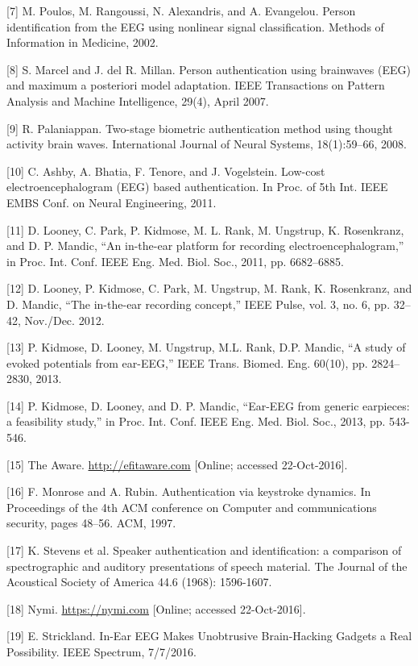 \documentclass[11pt]{article}
\begin{document}
[7]
M. Poulos, M. Rangoussi, N. Alexandris, and A. Evangelou. Person identification from the
EEG using nonlinear signal classification. Methods of Information in Medicine, 2002.

[8]
S. Marcel and J. del R. Millan. Person authentication using brainwaves (EEG) and
maximum a posteriori model adaptation. IEEE Transactions on Pattern Analysis and
Machine Intelligence, 29(4), April 2007.

[9]
R. Palaniappan. Two-stage biometric authentication method using thought activity brain
waves. International Journal of Neural Systems, 18(1):59–66, 2008.

[10]
C. Ashby, A. Bhatia, F. Tenore, and J. Vogelstein. Low-cost electroencephalogram (EEG)
based authentication. In Proc. of 5th Int. IEEE EMBS Conf. on Neural Engineering, 2011.

[11]
D. Looney, C. Park, P. Kidmose, M. L. Rank, M. Ungstrup, K. Rosenkranz, and D. P.
Mandic, “An in-the-ear platform for recording electroencephalogram,” in Proc. Int. Conf.
IEEE Eng. Med. Biol. Soc., 2011, pp. 6682–6885.

[12]
D. Looney, P. Kidmose, C. Park, M. Ungstrup, M. Rank, K. Rosenkranz, and D. Mandic,
“The in-the-ear recording concept,” IEEE Pulse, vol. 3, no. 6, pp. 32–42, Nov./Dec. 2012.

[13]
P. Kidmose, D. Looney, M. Ungstrup, M.L. Rank, D.P. Mandic, “A study of evoked
potentials from ear-EEG,” IEEE Trans. Biomed. Eng. 60(10), pp. 2824–2830, 2013.

[14]
P. Kidmose, D. Looney, and D. P. Mandic, “Ear-EEG from generic earpieces: a feasibility
study,” in Proc. Int. Conf. IEEE Eng. Med. Biol. Soc., 2013, pp. 543-546.

[15] The Aware. \url{http://efitaware.com} [Online; accessed 22-Oct-2016].

[16] F. Monrose and A. Rubin. Authentication via keystroke dynamics. In Proceedings of the 4th
ACM conference on Computer and communications security, pages 48–56. ACM, 1997.

[17]
K. Stevens et al. Speaker authentication and identification: a comparison of spectrographic
and auditory presentations of speech material. The Journal of the Acoustical Society of
America 44.6 (1968): 1596-1607.

[18] Nymi. \url{https://nymi.com} [Online; accessed 22-Oct-2016].

[19] E. Strickland. In-Ear EEG Makes Unobtrusive Brain-Hacking Gadgets a Real Possibility.
IEEE Spectrum, 7/7/2016.
\end{document}
